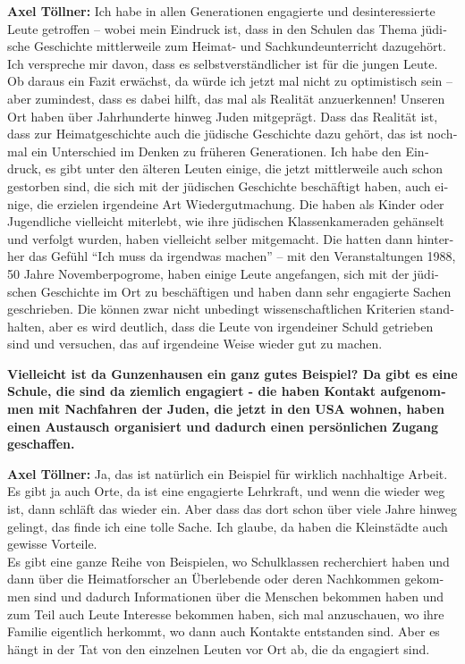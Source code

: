 \begin{otherlanguage}{ngerman}
\textbf{Axel Töllner:} Ich habe in allen Generationen engagierte und desinteressierte Leute getroffen – wobei mein Eindruck ist, dass in den Schulen das Thema jüdische Geschichte mittlerweile zum Heimat- und Sachkundeunterricht dazugehört. Ich verspreche mir davon, dass es selbstverständlicher ist für die jungen Leute. Ob daraus ein Fazit erwächst, da würde ich jetzt mal nicht zu optimistisch sein – aber zumindest, dass es dabei hilft, das mal als Realität anzuerkennen! Unseren Ort haben über Jahrhunderte hinweg Juden mitgeprägt. Dass das Realität ist, dass zur Heimatgeschichte auch die jüdische Geschichte dazu gehört, das ist nochmal ein Unterschied im Denken zu früheren Generationen. Ich habe den Eindruck, es gibt unter den älteren Leuten einige, die jetzt mittlerweile auch schon gestorben sind, die sich mit der jüdischen Geschichte beschäftigt haben, auch einige, die erzielen irgendeine Art Wiedergutmachung. Die haben als Kinder oder Jugendliche vielleicht miterlebt, wie ihre jüdischen Klassenkameraden gehänselt und verfolgt wurden, haben vielleicht selber mitgemacht. Die hatten dann hinterher das Gefühl "`Ich muss da irgendwas machen"' – mit den Veranstaltungen 1988, 50 Jahre Novemberpogrome, haben einige Leute angefangen, sich mit der jüdischen Geschichte im Ort zu beschäftigen und haben dann sehr engagierte Sachen geschrieben. Die können zwar nicht unbedingt wissenschaftlichen Kriterien standhalten, aber es wird deutlich, dass die Leute von irgendeiner Schuld getrieben sind und versuchen, das auf irgendeine Weise wieder gut zu machen. 

\textbf{Vielleicht ist da Gunzenhausen ein ganz gutes Beispiel? Da gibt es eine Schule, die sind da ziemlich engagiert - die haben Kontakt aufgenommen mit Nachfahren der Juden, die jetzt in den USA wohnen, haben einen Austausch organisiert und dadurch einen persönlichen Zugang geschaffen.}
 
\textbf{Axel Töllner:} Ja, das ist natürlich ein Beispiel für wirklich nachhaltige Arbeit. Es gibt ja auch Orte, da ist eine engagierte Lehrkraft, und wenn die wieder weg ist, dann schläft das wieder ein. Aber dass das dort schon über viele Jahre hinweg gelingt, das finde ich eine tolle Sache. Ich glaube, da haben die Kleinstädte auch gewisse Vorteile.\\  
Es gibt eine ganze Reihe von Beispielen, wo Schulklassen recherchiert haben und dann über die Heimatforscher an Überlebende oder deren Nachkommen gekommen sind und dadurch Informationen über die Menschen bekommen haben und zum Teil auch Leute Interesse bekommen haben, sich mal anzuschauen, wo ihre Familie eigentlich herkommt, wo dann auch Kontakte entstanden sind. Aber es hängt in der Tat von den einzelnen Leuten vor Ort ab, die da engagiert sind. 


\end{otherlanguage}
